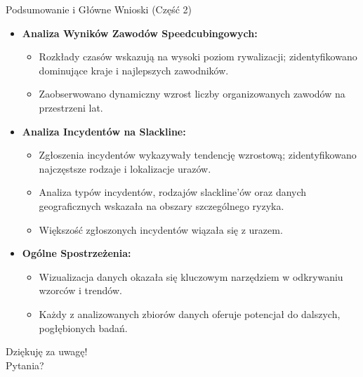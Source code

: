 \documentclass[10pt]{beamer} %
\begin{document}
\begin{frame}{Podsumowanie i Główne Wnioski (Część 2)}
  \begin{itemize}
    \item \textbf{Analiza Wyników Zawodów Speedcubingowych:}
    \begin{itemize}
        \item Rozkłady czasów wskazują na wysoki poziom rywalizacji; zidentyfikowano dominujące kraje i najlepszych zawodników.
        \item Zaobserwowano dynamiczny wzrost liczby organizowanych zawodów na przestrzeni lat.
    \end{itemize}

    \item \textbf{Analiza Incydentów na Slackline:}
    \begin{itemize}
        \item Zgłoszenia incydentów wykazywały tendencję wzrostową; zidentyfikowano najczęstsze rodzaje i lokalizacje urazów.
        \item Analiza typów incydentów, rodzajów slackline'ów oraz danych geograficznych wskazała na obszary szczególnego ryzyka.
        \item Większość zgłoszonych incydentów wiązała się z urazem.
    \end{itemize}

    \item \textbf{Ogólne Spostrzeżenia:}
    \begin{itemize}
        \item Wizualizacja danych okazała się kluczowym narzędziem w odkrywaniu wzorców i trendów.
        \item Każdy z analizowanych zbiorów danych oferuje potencjał do dalszych, pogłębionych badań.
    \end{itemize}
  \end{itemize}
\end{frame}

\begin{frame}
  \centering
  \Huge Dziękuję za uwagę!
  \\[2em] %
  {\large Pytania?}
\end{frame}
\end{document}
